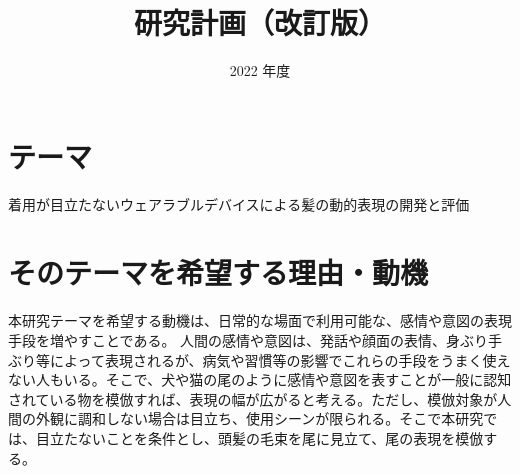 \documentclass[a4paper]{jsarticle}
\begin{document}
\masterthesis %


\title{研究計画（改訂版）}
\date{2022 年度}
\maketitle


\setcounter{page}{1} %



\newpage

\setcounter{page}{1} %


\section{テーマ}
着用が目立たないウェアラブルデバイスによる髪の動的表現の開発と評価

\section{そのテーマを希望する理由・動機}
本研究テーマを希望する動機は、日常的な場面で利用可能な、感情や意図の表現手段を増やすことである。
人間の感情や意図は、発話や顔面の表情、身ぶり手ぶり等によって表現されるが、病気や習慣等の影響でこれらの手段をうまく使えない人もいる。そこで、犬や猫の尾のように感情や意図を表すことが一般に認知されている物を模倣すれば、表現の幅が広がると考える。ただし、模倣対象が人間の外観に調和しない場合は目立ち、使用シーンが限られる。そこで本研究では、目立たないことを条件とし、頭髪の毛束を尾に見立て、尾の表現を模倣する。
\end{document}
